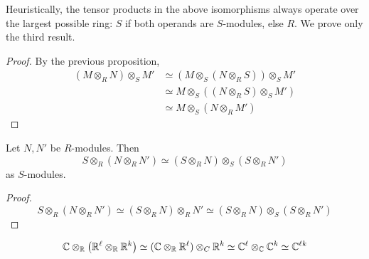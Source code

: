 Heuristically, the tensor products in the above isomorphisms always operate over the largest possible ring: \( S \) if both operands are \( S \)-modules, else \( R \).
We prove only the third result.
\begin{proof}
    By the previous proposition,
    \begin{align*}
        (M \otimes_R N) \otimes_S M' &\simeq (M \otimes_S (N \otimes_R S)) \otimes_S M' \\
        &\simeq M \otimes_S ((N \otimes_R S) \otimes_S M') \\
        &\simeq M \otimes_S (N \otimes_R M')
    \end{align*}
\end{proof}
\begin{corollary}
    Let \( N, N' \) be \( R \)-modules.
    Then
    \[ S \otimes_R (N \otimes_R N') \simeq (S \otimes_R N) \otimes_S (S \otimes_R N') \]
    as \( S \)-modules.
\end{corollary}
\begin{proof}
    \[ S \otimes_R (N \otimes_R N') \simeq (S \otimes_R N) \otimes_R N' \simeq (S \otimes_R N) \otimes_S (S \otimes_R N') \]
\end{proof}
\begin{example}
    \[ \mathbb C \otimes_{\mathbb R} \qty(\mathbb R^\ell \otimes_{\mathbb R} \mathbb R^k) \simeq (\mathbb C \otimes_{\mathbb R} \mathbb R^\ell) \otimes_C \mathbb R^k \simeq \mathbb C^\ell \otimes_{\mathbb C} \mathbb C^k \simeq \mathbb C^{\ell k} \]
\end{example}
